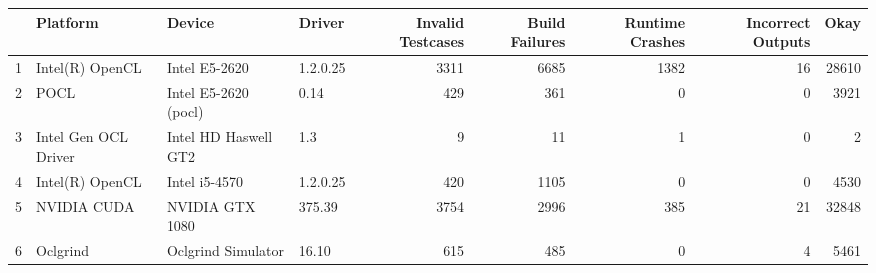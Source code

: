 \begin{tabular}{llllrrrrr}
\toprule
{} &              Platform &                Device &    Driver &  Invalid Testcases &  Build Failures &  Runtime Crashes &  Incorrect Outputs &   Okay \\
\midrule
1 &       Intel(R) OpenCL &         Intel E5-2620 &  1.2.0.25 &               3311 &            6685 &             1382 &                 16 &  28610 \\
2 &                  POCL &  Intel E5-2620 (pocl) &      0.14 &                429 &             361 &                0 &                  0 &   3921 \\
3 &  Intel Gen OCL Driver &  Intel HD Haswell GT2 &       1.3 &                  9 &              11 &                1 &                  0 &      2 \\
4 &       Intel(R) OpenCL &         Intel i5-4570 &  1.2.0.25 &                420 &            1105 &                0 &                  0 &   4530 \\
5 &           NVIDIA CUDA &       NVIDIA GTX 1080 &    375.39 &               3754 &            2996 &              385 &                 21 &  32848 \\
6 &              Oclgrind &    Oclgrind Simulator &     16.10 &                615 &             485 &                0 &                  4 &   5461 \\
\bottomrule
\end{tabular}
